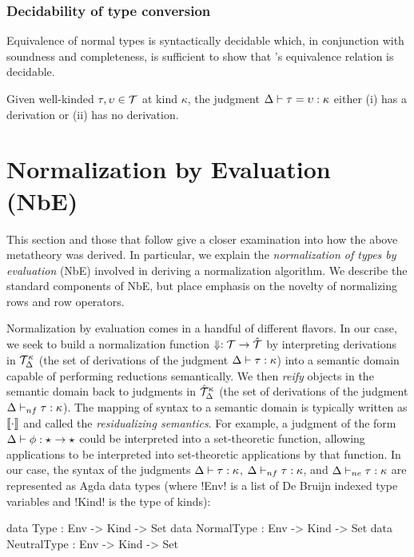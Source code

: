 \documentclass[sigplan,10pt,review]{acmart}\settopmatter{printfolios=true,printccs=false,printacmref=false}
\begin{document}
\subsubsection{Decidability of type conversion}

Equivalence of normal types is syntactically decidable which, in conjunction with soundness and completeness, is sufficient to show that \Rome's equivalence relation is decidable.

\begin{theorem}[Decidability]
  Given well-kinded $\tau, \upsilon \in {\mathcal T}$ at kind $\kappa$, the judgment $\Delta \vdash \tau = \upsilon : \kappa$ either (i) has a derivation or (ii) has no derivation.
\end{theorem}

\section{Normalization by Evaluation (NbE)}
This section and those that follow give a closer examination into how the above metatheory was derived. In particular, we explain the \emph{normalization of types by evaluation} (NbE) involved in deriving a normalization algorithm. We describe the standard components of NbE, but place emphasis on the novelty of normalizing rows and row operators.

\InlineOn{}
Normalization by evaluation comes in a handful of different flavors. In our case, we seek to build a normalization function $\Downarrow : {\mathcal T} \to \hat{{\mathcal T}}$ by interpreting derivations in ${\mathcal T}_{\Delta}^{\kappa}$ (the set of derivations of the judgment $\Delta \vdash \tau : \kappa$) into a semantic domain capable of performing reductions semantically. We then \emph{reify} objects in the semantic domain back to judgments in $\hat{{\mathcal T}}_{\Delta}^{\kappa}$ (the set of derivations of the judgment $\Delta \vdash_{nf} \tau : \kappa$). The mapping of syntax to a semantic domain is typically written as $\llbracket \cdot \rrbracket$ and called the \emph{residualizing semantics}. For example, a judgment of the form $\Delta \vdash \phi : \star_{} \to \star_{}$ could be interpreted into a set-theoretic function, allowing applications to be interpreted into set-theoretic applications by that function. In our case, the syntax of the judgments $\Delta \vdash \tau : \kappa$, $\Delta \vdash_{nf} \tau : \kappa$, and $\Delta \vdash_{ne} \tau : \kappa$ are represented as Agda data types (where !Env! is a list of De Bruijn indexed type variables and !Kind! is the type of kinds): 

\begin{agda}
data Type : Env -> Kind -> Set
data NormalType : Env -> Kind -> Set
data NeutralType : Env -> Kind -> Set 
\end{agda}
\end{document}
